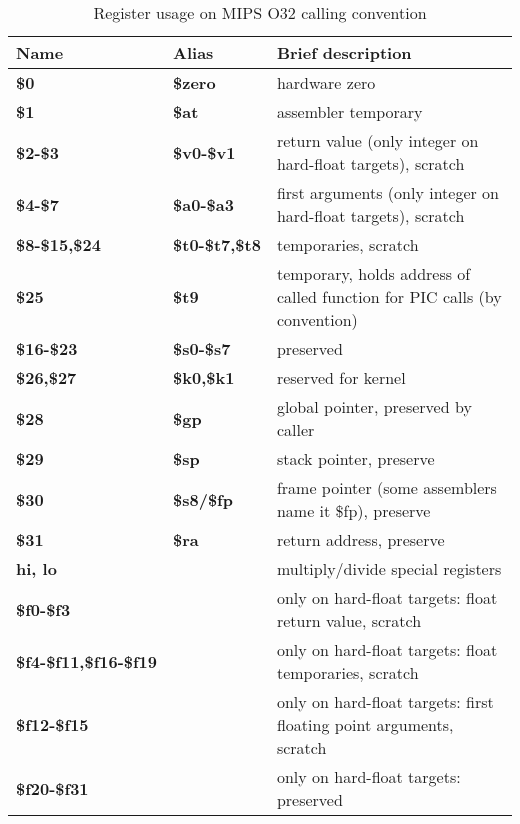 \begin{table}[h]
\begin{tabular*}{0.95\textwidth}{lll}
Name                         & Alias                & Brief description\\
\hline                                                             
{\bf \$0}                    & {\bf \$zero}         & hardware zero \\
{\bf \$1}                    & {\bf \$at}           & assembler temporary \\
{\bf \$2-\$3}                & {\bf \$v0-\$v1}      & return value (only integer on hard-float targets), scratch \\
{\bf \$4-\$7}                & {\bf \$a0-\$a3}      & first arguments (only integer on hard-float targets), scratch\\
{\bf \$8-\$15,\$24}          & {\bf \$t0-\$t7,\$t8} & temporaries, scratch \\
{\bf \$25}                   & {\bf \$t9}           & temporary, holds address of called function for PIC calls (by convention) \\
{\bf \$16-\$23}              & {\bf \$s0-\$s7}      & preserved \\
{\bf \$26,\$27}              & {\bf \$k0,\$k1}      & reserved for kernel \\
{\bf \$28}                   & {\bf \$gp}           & global pointer, preserved by caller \\
{\bf \$29}                   & {\bf \$sp}           & stack pointer, preserve \\
{\bf \$30}                   & {\bf \$s8/\$fp}      & frame pointer (some assemblers name it \$fp), preserve \\
{\bf \$31}                   & {\bf \$ra}           & return address, preserve \\
{\bf hi, lo}                 &                      & multiply/divide special registers \\
{\bf \$f0-\$f3}              &                      & only on hard-float targets: float return value, scratch \\
{\bf \$f4-\$f11,\$f16-\$f19} &                      & only on hard-float targets: float temporaries, scratch \\
{\bf \$f12-\$f15}            &                      & only on hard-float targets: first floating point arguments, scratch \\
{\bf \$f20-\$f31}            &                      & only on hard-float targets: preserved \\
\end{tabular*}
\caption{Register usage on MIPS O32 calling convention}
\end{table}

